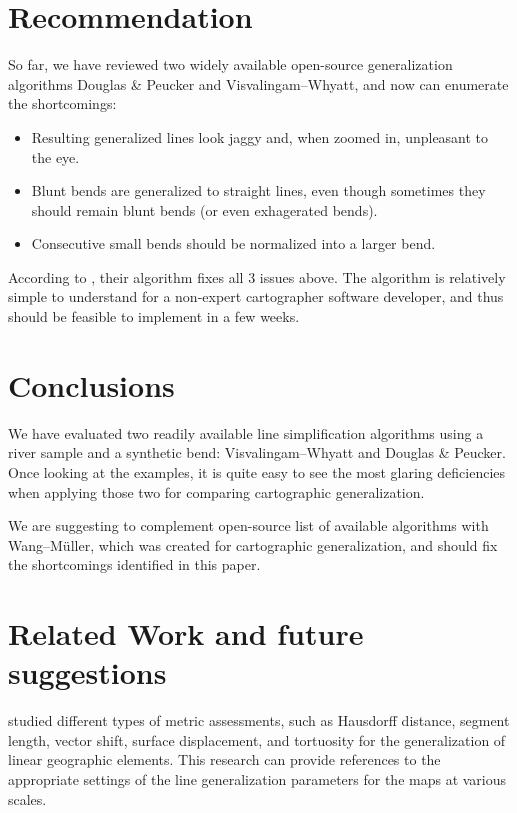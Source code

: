 \documentclass[a4paper]{article}
\newcommand{\DP}{Douglas \& Peucker}
\newcommand{\VW}{Visvalingam--Whyatt}
\newcommand{\WM}{Wang--M{\"u}ller}
\begin{document}
\section{Recommendation}
\label{sec:recommendation}

So far, we have reviewed two widely available open-source generalization
algorithms {\DP} and {\VW}, and now can enumerate the shortcomings:
\begin{itemize}
    \item Resulting generalized lines look jaggy and, when zoomed in,
        unpleasant to the eye.
    \item Blunt bends are generalized to straight lines, even though sometimes
        they should remain blunt bends (or even exhagerated bends).
    \item Consecutive small bends should be normalized into a larger bend.
\end{itemize}

According to \cite{wang1998line}, their algorithm fixes all 3 issues above. The
algorithm is relatively simple to understand for a non-expert cartographer
software developer, and thus should be feasible to implement in a few weeks.

\section{Conclusions}
\label{sec:conclusions}

We have evaluated two readily available line simplification algorithms using a
river sample and a synthetic bend: {\VW} and {\DP}. Once looking at the
examples, it is quite easy to see the most glaring deficiencies when applying
those two for comparing cartographic generalization.

We are suggesting to complement open-source list of
available algorithms with {\WM}, which was created for cartographic
generalization, and should fix the shortcomings identified in this paper.

\section{Related Work and future suggestions}
\label{sec:related_work}

\cite{stanislawski2012automated} studied different types of metric assessments,
such as Hausdorff distance, segment length, vector shift, surface displacement,
and tortuosity for the generalization of linear geographic elements. This
research can provide references to the appropriate settings of the line
generalization parameters for the maps at various scales.
\end{document}
